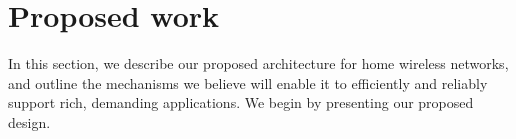 \section{Proposed work}
\label{sec:proposed}


In this section, we describe our proposed architecture for home wireless networks, and outline the mechanisms we believe will enable it to efficiently and reliably support rich, demanding applications. We begin by presenting our proposed design.

%

